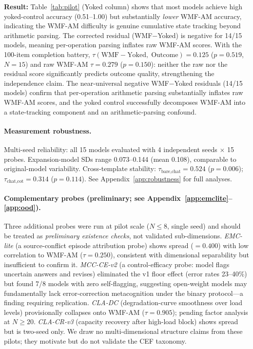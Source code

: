 \documentclass{article}
\begin{document}
\textbf{Result:} Table~\ref{tab:pilot} (Yoked column) shows that most
models achieve high yoked-control accuracy (0.51--1.00) but substantially
\emph{lower} WMF-AM accuracy, indicating the WMF-AM difficulty is
genuine cumulative state tracking beyond arithmetic parsing.
The corrected residual (WMF$-$Yoked) is negative for 14/15 models,
meaning per-operation parsing inflates raw WMF-AM scores.
With the 100-item completion battery,
$\tau(\text{WMF}{-}\text{Yoked},\;\text{Outcome}) = 0.125$
($p = 0.519$, $N{=}15$) and raw WMF-AM $\tau = 0.279$ ($p = 0.150$):
neither the raw nor the residual score significantly predicts outcome
quality, strengthening the independence claim. The near-universal
negative WMF$-$Yoked residuals (14/15 models) confirm that
per-operation arithmetic parsing substantially inflates raw WMF-AM
scores, and the yoked control successfully decomposes WMF-AM into a
state-tracking component and an arithmetic-parsing confound.

\paragraph{Measurement robustness.}
Multi-seed reliability: all 15 models evaluated with 4 independent seeds
$\times$ 15 probes. Expansion-model SDs range 0.073--0.144 (mean 0.108),
comparable to original-model variability. Cross-template stability:
$\tau_{\text{bare,chat}} = 0.524$ ($p = 0.006$); $\tau_{\text{chat,cot}}
= 0.314$ ($p = 0.114$). See Appendix~\ref{app:robustness} for full
analyses.

\paragraph{Complementary probes (preliminary; see Appendix~\ref{app:emclite}--\ref{app:ood}).}
Three additional probes were run at pilot scale ($N \leq 8$, single
seed) and should be treated as \emph{preliminary existence checks},
not validated sub-dimensions.
\emph{EMC-lite} (a source-conflict episode attribution probe) shows spread
($= 0.400$) with low correlation to WMF-AM ($\tau = 0.250$), consistent with
dimensional separability but insufficient to confirm it.
\emph{MCC-CE-v2} (a control-efficacy probe: model flags uncertain answers and revises)
eliminated the v1 floor effect (error rates 23--40\%) but found 7/8
models with zero self-flagging, suggesting open-weight models may
fundamentally lack error-correction metacognition under the binary
protocol---a finding requiring replication.
\emph{CLA-DC} (degradation-curve smoothness over load levels)
provisionally collapses onto WMF-AM ($\tau = 0.905$); pending factor analysis at $N\geq 20$.
\emph{CLA-CR-v3} (capacity recovery after high-load block) shows spread but is
two-seed only. We draw no multi-dimensional structure claims from
these pilots; they motivate but do not validate the CEF taxonomy.
\end{document}
